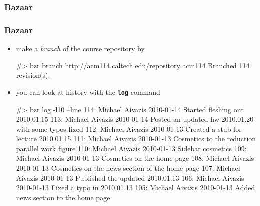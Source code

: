\begin{frame}[fragile]
%
  \frametitle{Bazaar}
%
%
\end{frame}

\begin{frame}[fragile]
%
  \frametitle{Bazaar}
%
  \begin{itemize}
%
  \item make a {\em branch} of the course repository by
%
    \begin{shell}

#> bzr branch http://acm114.caltech.edu/repository acm114
Branched 114 revision(s).
    \end{shell}
%
  \item you can look at history with the {\tt\small\bfseries log} command
%
    \begin{shell}

#> bzr log -l10 --line
114: Michael Aivazis 2010-01-14 Started fleshing out 2010.01.15
113: Michael Aivazis 2010-01-14 Posted an updated hw 2010.01.20 with some typos fixed
112: Michael Aivazis 2010-01-13 Created a stub for lecture 2010.01.15
111: Michael Aivazis 2010-01-13 Cosmetics to the reduction parallel work figure
110: Michael Aivazis 2010-01-13 Sidebar cosmetics
109: Michael Aivazis 2010-01-13 Cosmetics on the home page
108: Michael Aivazis 2010-01-13 Cosmetics on the news section of the home page
107: Michael Aivazis 2010-01-13 Published the updated 2010.01.13
106: Michael Aivazis 2010-01-13 Fixed a typo in 2010.01.13
105: Michael Aivazis 2010-01-13 Added news section to the home page
    \end{shell}
%
  \end{itemize}
%
\end{frame}

